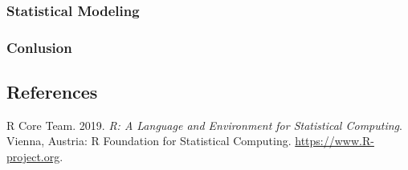 \documentclass[
]{article}
\newlength{\cslhangindent}
\newlength{\cslentryspacingunit} %
\newenvironment{CSLReferences}[2] %
 {%
  \setlength{\parindent}{0pt}
  \ifodd #1
  \let\oldpar\par
  \def\par{\hangindent=\cslhangindent\oldpar}
  \fi
  \setlength{\parskip}{#2\cslentryspacingunit}
 }%
 {}
\begin{document}
\hypertarget{statistical-modeling}{%
\subsubsection{Statistical Modeling}\label{statistical-modeling}}

\hypertarget{conlusion}{%
\subsubsection{Conlusion}\label{conlusion}}

\hypertarget{references}{%
\subsection*{References}\label{references}}

\hypertarget{refs}{}
\begin{CSLReferences}{1}{0}
\leavevmode{}%
R Core Team. 2019. \emph{R: A Language and Environment for Statistical
Computing}. Vienna, Austria: R Foundation for Statistical Computing.
\url{https://www.R-project.org}.

\end{CSLReferences}
\end{document}
